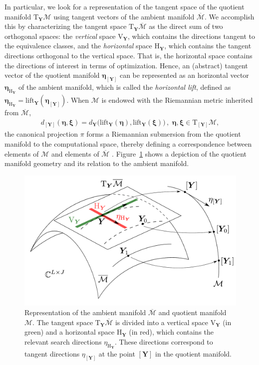 In particular, we look for a representation of the tangent space of the quotient manifold $\mathrm{T}_{\bm{Y}}\mathcal{M}$ using tangent vectors of the ambient manifold $\overline{\mathcal{M}}$. 
We accomplish this by characterizing the tangent space $\mathrm{T}_{\bm{Y}}\overline{\mathcal{M}}$ as the direct sum of two orthogonal spaces: the \textit{vertical} space $\mathrm{V}_{\bm{Y}}$, which contains the directions tangent to the equivalence classes, and the \textit{horizontal} space $\mathrm{H}_{\bm{Y}}$, which contains the tangent directions orthogonal to the vertical space. 
That is, the horizontal space contains the directions of interest in terms of optimization. Hence, an (abstract) tangent vector of the quotient manifold $\bm{\eta}_{[\bm{Y}]}$ can be represented as an horizontal vector $\bm{\eta}_{\mathrm{H}_{\bm{Y}}}$ of the ambient manifold, which is called the \emph{horizontal lift}, defined as $\bm{\eta}_{\mathrm{H}_{\bm{Y}}}=\mathrm{lift}_{\bm{Y}}(\bm{\eta}_{[\bm{Y}]})$. When $\mathcal{M}$ is endowed with the Riemannian metric inherited from $\overline{\mathcal{M}}$,
\begin{align}
	d_{[\bm{Y}]}(\bm{\eta},\bm{\xi})=d_{\bm{Y}}\big(\mathrm{lift}_{\bm{Y}}(\bm{\eta}),\mathrm{lift}_{\bm{Y}}(\bm{\xi})\big)\,,\,\, \bm{\eta},\bm{\xi}\in\mathrm{T}_{[\bm{Y}]}{\mathcal{M}},\nonumber
\end{align}
the canonical projection $\pi$ forms a Riemannian submersion from the quotient manifold to the computational space, thereby defining a correspondence between elements of $\mathcal{M}$ and elements of $\overline{\mathcal{M}}$ \cite{Absil2008book}. 
Figure~\ref{rocma:fig:qmanifold} shows a depiction of the quotient manifold geometry and its relation to the ambient manifold.
\begin{figure}
	\centering
	\includegraphics[width=0.65\linewidth]{./figs/rocma_figs/q_manifold_8.pdf}
	\caption[Representation of the ambient manifold and quotient manifold.]{Representation of the ambient manifold $\overline{\mathcal{M}}$ and quotient manifold $\mathcal{M}$. The tangent space $\mathrm{T}_{\bm{Y}}\overline{\mathcal{M}}$ is divided into a vertical space $\mathrm{V}_{\bm{Y}}$ (in green) and a horizontal space $\mathrm{H}_{\bm{Y}}$ (in red), which contains the relevant search directions $\eta_{\mathrm{H}_{\bm{Y}}}$. These directions correspond to  tangent directions $\eta_{[\bm{Y}]}$ at the point $[\bm{Y}]$ in the quotient manifold.}\label{rocma:fig:qmanifold}
\end{figure}

